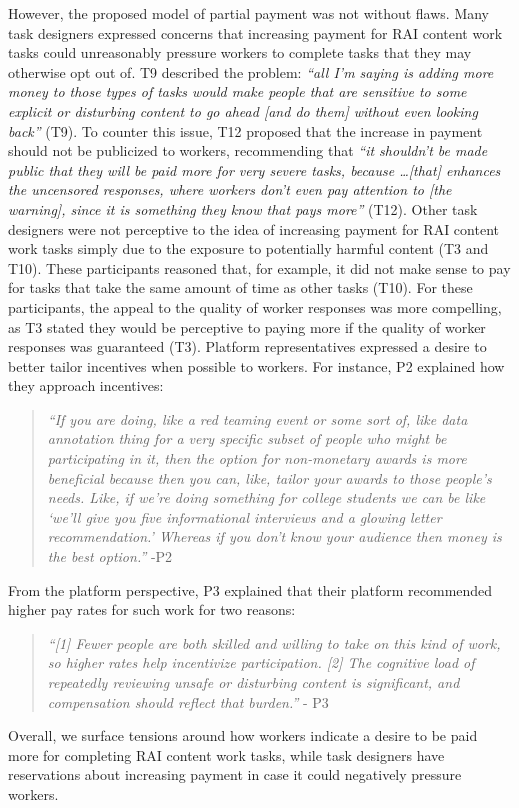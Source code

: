 However, the proposed model of partial payment was not without flaws. Many task designers expressed concerns that increasing payment for RAI content work tasks could unreasonably pressure workers to complete tasks that they may otherwise opt out of.  T9 described the problem: \textit{``all I'm saying is adding more money to those types of tasks would make people that are sensitive to some explicit or disturbing content to go ahead [and do them] without even looking back''} (T9). To counter this issue, T12 proposed that the increase in payment should not be publicized to workers, recommending that \textit{``it shouldn't be made public that they will be paid more for very severe tasks, because \dots [that] enhances the uncensored responses, where workers don't even pay attention to [the warning], since it is something they know that pays more''} (T12). Other task designers were not perceptive to the idea of increasing payment for RAI content work tasks simply due to the exposure to potentially harmful content (T3 and T10). These participants reasoned that, for example, it did not make sense to pay for tasks that take the same amount of time as other tasks (T10). For these participants, the appeal to the quality of worker responses was more compelling, as T3 stated they would be perceptive to paying more if the quality of worker responses was guaranteed (T3). Platform representatives expressed a desire to better tailor incentives when possible to workers. For instance, P2 explained how they approach incentives:
\begin{quote}
    \textit{``If you are doing, like a red teaming event or some sort of, like data annotation thing for a very specific subset of people who might be participating in it, then the option for non-monetary awards is more beneficial because then you can, like, tailor your awards to those people's needs. Like, if we're doing something for college students we can be like `we'll give you five informational interviews and a glowing letter recommendation.' Whereas if you don't know your audience then money is the best option.''} -P2
\end{quote}
From the platform perspective, P3 explained that their platform recommended higher pay rates for such work for two reasons:
\begin{quote}
    \textit{``[1] Fewer people are both skilled and willing to take on this kind of work, so higher rates help incentivize participation. [2] The cognitive load of repeatedly reviewing unsafe or disturbing content is significant, and compensation should reflect that burden.''} - P3
\end{quote}
Overall, we surface tensions around how workers indicate a desire to be paid more for completing RAI content work tasks, while task designers have reservations about increasing payment in case it could negatively pressure workers. 


